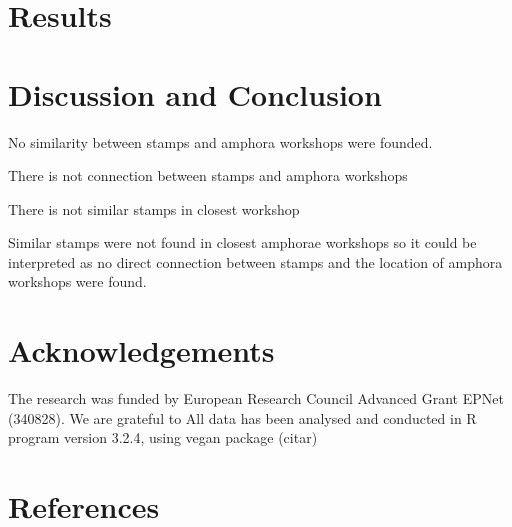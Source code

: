 \documentclass[review]{elsarticle}
\begin{document}

\section{Results}








\section{Discussion and Conclusion}

No similarity between stamps and amphora workshops were founded. 

There is not connection between stamps and amphora workshops

There is not similar stamps in closest workshop 

Similar stamps were not found in closest amphorae workshops so it could be interpreted as no direct connection between stamps and the location of amphora workshops were found. 

\section{Acknowledgements}

The research was funded by European Research Council Advanced Grant
EPNet (340828). We are grateful to 
All data has been analysed and conducted in R program version 3.2.4, using vegan package (citar) 


\section{References}


\end{document}
